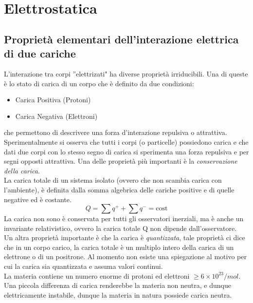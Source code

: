 \setcounter{chapter}{0}
\chapter{Elettrostatica}

\section{Propriet\`a elementari dell'interazione elettrica di due cariche}

L'interazione tra corpi ''elettrizati" ha diverse propriet\`a irriducibili. Una di queste \`e lo stato di carica di un corpo che \`e definito da due condizioni:
\begin{itemize}
	\item Carica Positiva (Protoni)
	\item Carica Negativa (Elettroni)
\end{itemize}

che permettono di descrivere una forza d'interazione repulsiva o attrattiva. 
\\
Sperimentalmente si osserva che tutti i corpi (o particelle) possiedono carica e che dati due corpi con lo stesso segno di carica si sperimenta una forza repulsiva e per segni opposti attrattiva. Una delle propriet\`a pi\`u importanti \`e la \textit{conservazione della carica}.
\\
La carica totale di un sistema isolato (ovvero che non scambia carica con l'ambiente), \`e definita dalla somma algebrica delle cariche positive e di quelle negative ed \`e costante.
\begin{equation*}
	Q = \sum q^+ + \sum q^- = \text{cost}
\end{equation*} 
La carica non sono \`e conservata per tutti gli osservatori inerziali, ma \`e anche un invariante relativistico, ovvero la carica totale Q non dipende dall'osservatore.
\\
Un altra propriet\`a importante \`e che la carica \`e \textit{quantizzata}, tale propriet\`a ci dice che in un corpo carico, la carica totale \`e un multiplo intero della carica di un elettrone o di un positrone. Al momento non esiste una spiegazione al motivo per cui la carica sia quantizzata e assuma valori continui.
\\
La materia contiene un numero enorme di protoni ed elettroni $\geq 6 \times 10^{23}/mol$. Una piccola differenza di carica renderebbe la materia non neutra, e dunque elettricamente instabile, dunque la materia in natura possiede carica neutra.

